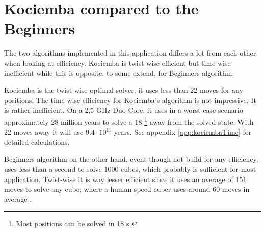 \section{Kociemba compared to the Beginners}
The two algorithms implemented in this application differs a lot from each other when looking at efficiency. 
Kociemba is twist-wise efficient but time-wise inefficient while this is opposite, to some extend, for Beginners algorithm. 

Kociemba is the twist-wise optimal solver; it uses less than 22 moves for any positions. 
The time-wise efficiency for Kociemba's algorithm is not impressive. It is rather inefficient. On a 2,5 GHz Duo Core, it uses in a worst-case scenario approximately 28 million years to solve a \cube{} 18 \twist{}\footnote{Most positions can be solved in 18 \twist{}s \cite{kociemba09}} away from the solved state. With 22 moves away it will use $9.4\cdot{}10^{11}$ years. See appendix \ref{app:kociembaTime} for detailed calculations.   

Beginners algorithm on the other hand, event though not build for any efficiency, uses less than a second to solve 1000 cubes, which probably is sufficient for most application. 
Twist-wise it is way lesser efficient since it uses an average of 151 moves to solve any cube; where a human speed cuber uses around 60 moves in average \cite{larsPetrus97} \cite{cubeFreak}.
